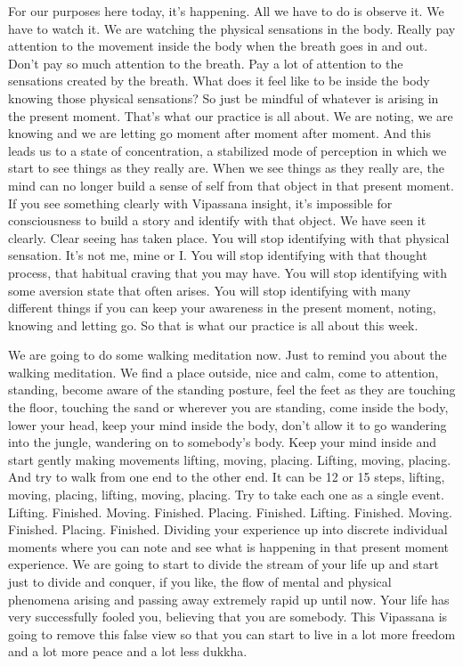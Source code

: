 \documentclass[letterpaper,10pt,english]{sphinxmanual}
\begin{document}
\sphinxAtStartPar
For our purposes here today, it’s happening. All we have to do is observe
it. We have to watch it. We are watching the physical sensations in the body.
Really pay attention to the movement inside the body when the breath goes
  in and out. Don’t pay so much attention to the breath. Pay a lot of attention
to the sensations created by the breath. What does it feel like to be inside the
body knowing those physical sensations? So just be mindful of whatever is
arising in the present moment. That’s what our practice is all about. We are
noting, we are knowing and we are letting go moment after moment after
moment. And this leads us to a state of concentration, a stabilized mode of
perception in which we start to see things as they really are. When we see
things as they really are, the mind can no longer build a sense of self from
that object in that present moment. If you see something clearly with Vipassana insight, it’s impossible for consciousness to build a story and identify
with that object. We have seen it clearly. Clear seeing has taken place. You
will stop identifying with that physical sensation. It’s not me, mine or I. You
will  stop  identifying  with  that  thought  process,  that  habitual  craving  that
you may have. You will stop identifying with some aversion state that often
arises. You will stop identifying with many different things if you can keep
your awareness in the present moment, noting, knowing and letting go. So
that is what our practice is all about this week.

\sphinxAtStartPar
We are going to do some walking meditation now. Just to remind you
about the walking meditation. We find a place outside, nice and calm, come
to attention, standing, become aware of the standing posture, feel the feet as
they are touching the floor, touching the sand or wherever you are standing,
come inside the body, lower your head, keep your mind inside the body, don’t
allow it to go wandering into the jungle, wandering on to somebody’s body.
Keep your mind inside and start gently making movements lifting, moving,
placing. Lifting, moving, placing. And try to walk from one end to the other
end. It can be 12 or 15 steps, lifting, moving, placing, lifting, moving, placing. Try to take each one as a single event. Lifting. Finished. Moving. Finished. Placing. Finished. Lifting. Finished. Moving. Finished. Placing. Finished. Dividing your experience up into discrete individual moments where
you can note and see what is happening in that present moment experience.
We are going to start to divide the stream of your life up and start just to
divide and conquer, if you like, the flow of mental and physical phenomena
arising and passing away extremely rapid up until now. Your life has very
  successfully  fooled  you,  believing  that  you  are  somebody. This Vipassana
is going to remove this false view so that you can start to live in a lot more
freedom and a lot more peace and a lot less dukkha.
\end{document}
